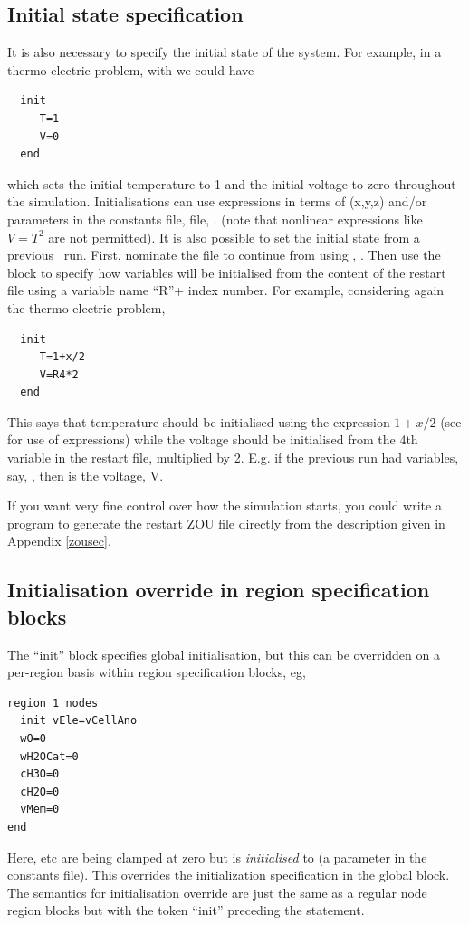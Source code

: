 \documentclass[a4paper,twoside,11pt]{book}
\begin{document}
\subsection{Initial state specification}
\label{initsec}
It is also necessary to specify the initial state of the system. For
example, in a thermo-electric problem, with  
we could have
\begin{verbatim}
  init
     T=1
     V=0
  end
\end{verbatim}
which sets the initial temperature to 1 and the initial voltage to
zero throughout the simulation. Initialisations can use  expressions in terms of
(x,y,z) and/or parameters in the constants file,  file, . (note that nonlinear
expressions like $V=T^2$ are not permitted). It is also possible
to set the initial state from a previous \zinc\ run. First, nominate
the file to continue from using , . Then use the
 block to specify how variables will be initialised from the
content of the restart file using a variable name ``R''+ index
number. For example, considering again the thermo-electric problem,
\begin{verbatim}
  init
     T=1+x/2
     V=R4*2
  end
\end{verbatim}
This says that temperature should be initialised using the expression
$1+x/2$ (see  for use of expressions) while the
voltage should be initialised from the 4th variable in the restart
file, multiplied by 2. E.g. if the previous run had variables, say,
, then  is the voltage, V.

If you want very fine control over how the simulation starts, you
could write a program to generate the restart ZOU file directly from
the description given in Appendix \ref{zousec}.

\subsection{Initialisation override in region specification blocks}
The ``init'' block specifies global initialisation, but this can be
overridden on a per-region basis within region specification blocks, eg,
\begin{verbatim}
region 1 nodes
  init vEle=vCellAno
  wO=0
  wH2OCat=0
  cH3O=0
  cH2O=0
  vMem=0
end
\end{verbatim}
Here,  etc are being clamped at zero but  is
\emph{initialised} to  (a parameter in the constants
file). This overrides the initialization specification in the global
 block. The semantics for initialisation override are just
the same as a regular node region blocks but with the token ``init''
preceding the statement.
\end{document}

